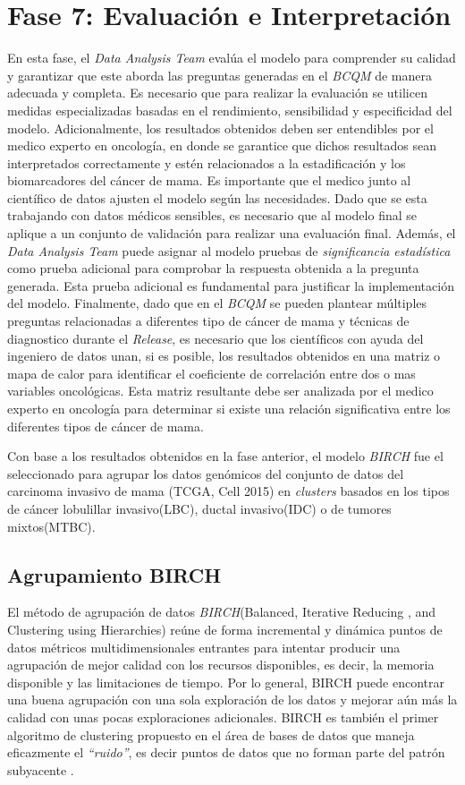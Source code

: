 \section{Fase 7: Evaluación e Interpretación}
En esta fase, el \textit{Data Analysis Team} evalúa el modelo para comprender su calidad y garantizar que este aborda las preguntas generadas en el \textit{BCQM} de manera adecuada y completa. Es necesario que para realizar la evaluación se utilicen medidas especializadas basadas en el rendimiento, sensibilidad y especificidad del modelo. Adicionalmente, los resultados obtenidos deben ser entendibles por el medico experto en oncología, en donde se garantice que dichos resultados sean interpretados correctamente y estén relacionados a la estadificación y los biomarcadores del cáncer de mama. Es importante que el medico junto al científico de datos ajusten el modelo según las necesidades. Dado que se esta trabajando con datos médicos sensibles, es necesario que al modelo final se aplique a un conjunto de validación para realizar una evaluación final. Además, el \textit{Data Analysis Team} puede asignar al modelo pruebas de \textit{significancia estadística} como prueba adicional para comprobar la respuesta obtenida a la pregunta generada. Esta prueba adicional es fundamental para justificar la implementación del modelo. Finalmente, dado que en el \textit{BCQM} se pueden plantear múltiples preguntas relacionadas a diferentes tipo de cáncer de mama y técnicas de diagnostico durante el \textit{Release}, es necesario que los científicos con ayuda del ingeniero de datos unan, si es posible, los resultados obtenidos en una matriz o mapa de calor para identificar el coeficiente de correlación entre dos o mas variables oncológicas. Esta matriz resultante debe ser analizada por el medico experto en oncología para determinar si existe una relación significativa entre los diferentes tipos de cáncer de mama.

Con base a los resultados obtenidos en la fase anterior, el modelo \textit{BIRCH} fue el seleccionado para agrupar los datos genómicos del conjunto de datos del carcinoma invasivo de mama (TCGA, Cell 2015) en \textit{clusters} basados en los tipos de cáncer lobulillar invasivo(LBC), ductal invasivo(IDC) o de tumores mixtos(MTBC).

\subsection{Agrupamiento BIRCH}
El  método de agrupación de datos \textit{BIRCH}(Balanced, Iterative Reducing , and Clustering using Hierarchies) reúne de forma incremental y dinámica puntos de datos métricos multidimensionales entrantes para intentar producir una agrupación de mejor calidad con los recursos disponibles, es decir, la memoria disponible y las limitaciones de tiempo. Por lo general, BIRCH puede encontrar una buena agrupación con una sola exploración de los datos y mejorar aún más la calidad con unas pocas exploraciones adicionales. BIRCH es también el primer algoritmo de clustering propuesto en el área de bases de datos que maneja eficazmente el \textit{“ruido”}, es decir puntos de datos que no forman parte del patrón subyacente \cite{Zhang1996}. 

